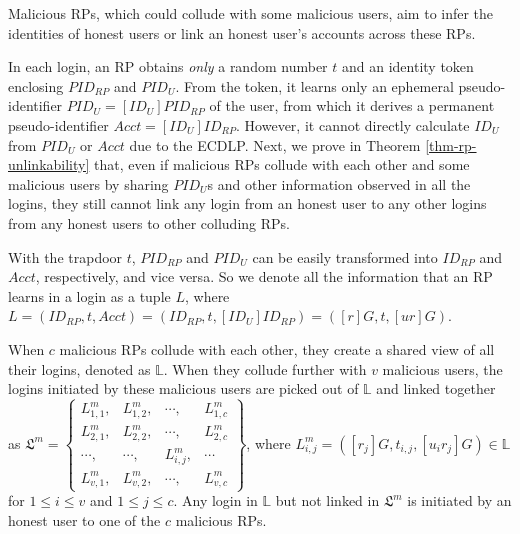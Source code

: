 Malicious RPs,
which could collude with some malicious users,
aim to infer the identities of honest users
    or link an honest user's accounts across these RPs.


In each login, an RP obtains \emph{only} a random number $t$ and an identity token enclosing $PID_{RP}$ and $PID_U$. From the token, it learns only an ephemeral pseudo-identifier $PID_{U} = [{ID_U}]{PID_{RP}}$ of the user, from which it derives a permanent pseudo-identifier $Acct = [ID_U]ID_{RP}$. However, it cannot directly calculate $ID_U$ from $PID_{U}$ or $Acct$ due to the ECDLP.
Next, we prove in Theorem \ref{thm-rp-unlinkability} that, even if malicious RPs collude with each other and some malicious users by sharing $PID_U$s and other information observed in all the logins, they still cannot link any login from an honest user to any other logins from any honest users to other colluding RPs.


With the trapdoor $t$, $PID_{RP}$ and $PID_U$ can be easily transformed into $ID_{RP}$ and $Acct$, respectively, and vice versa.
So we denote all the information that an RP learns in a login as a tuple $L$, where $L =(ID_{RP}, t, Acct)=(ID_{RP}, t, [ID_{U}]ID_{RP})=([r]G, t, [ur]G)$.

When $c$ malicious RPs collude with each other, they create a shared view of all their logins, denoted as $\mathbb{L}$.
When they collude further with $v$ malicious users, the logins initiated by these malicious users are picked out of $\mathbb{L}$ and linked together as
$\mathfrak{L}^m=\left \{ \begin{matrix}
L^m_{1,1},&L^m_{1,2},&\cdots,&L^m_{1,c}\\
L^m_{2,1},& L^m_{2,2},&\cdots,&L^m_{2,c}\\
\cdots,&\cdots,&L^m_{i,j},&\cdots\\
L^m_{v,1},&L^m_{v,2},&\cdots,&L^m_{v,c}
\end{matrix}\right\}$,
where $L^m_{i, j}=([r_j]G, t_{i,j}, [u_ir_j]G) \in \mathbb{L}$ for $1 \le i \le v$ and $1 \le j \le c$. Any login in $\mathbb{L}$ but not linked in $\mathfrak{L}^m$ is initiated by an honest user to one of the $c$ malicious RPs.

